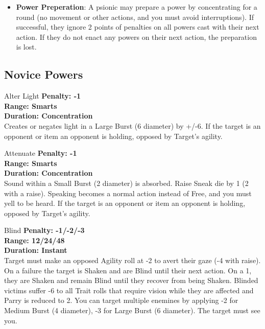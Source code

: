 \begin{multicols}{2}
\begin{itemize}
  \item \textbf{Power Preperation}: A psionic may prepare a power by concentrating for a round (no movement or other actions, and you must avoid interruptions). If successful, they ignore 2 points of penalties on all powers cast with their next action. If they do not enact any powers on their next action, the preparation is lost.

\end{itemize}

\subsection{Novice Powers}

\begin{genericsection}{Alter Light}
\textbf{Penalty: -1}\\
\textbf{Range: Smarts}\\
\textbf{Duration: Concentration}\\
Creates or negates light in a Large Burst (6 diameter) by +/-6. If the target is an opponent or item an opponent is holding, opposed by Target's agility.
\end{genericsection}

\begin{genericsection}{Attenuate}
\textbf{Penalty: -1}\\
\textbf{Range: Smarts}\\
\textbf{Duration: Concentration}\\
Sound within a Small Burst (2 diameter) is absorbed. Raise Sneak die by 1 (2 with a raise). Speaking becomes a normal action instead of Free, and you must yell to be heard. If the target is an opponent or item an opponent is holding, opposed by Target's agility.
\end{genericsection}

\begin{genericsection}{Blind}
\textbf{Penalty: -1/-2/-3}\\
\textbf{Range: 12/24/48}\\
\textbf{Duration: Instant}\\
Target must make an opposed Agility roll at -2 to avert their gaze (-4 with raise). On a failure the target is Shaken and are Blind until their next action. On a 1, they are Shaken and remain Blind until they recover from being Shaken. Blinded victims suffer -6 to all Trait rolls that require vision while they are affected and Parry is reduced to 2. You can target multiple enemines by applying -2 for Medium Burst (4 diameter), -3 for Large Burst (6 diameter). The target must see you.
\end{genericsection}


\end{multicols}
